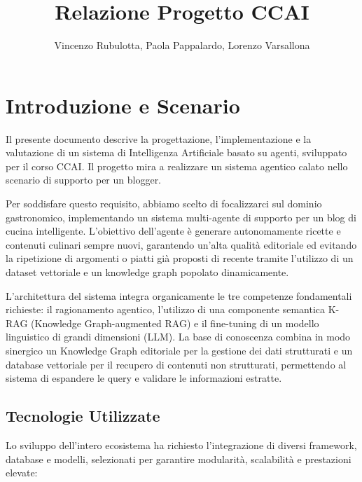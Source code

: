 \documentclass[11pt, a4paper]{article}
\title{Relazione Progetto CCAI}
\author{Vincenzo Rubulotta, Paola Pappalardo, Lorenzo Varsallona}
\date{}
\begin{document}
\maketitle

\section{Introduzione e Scenario}

Il presente documento descrive la progettazione, l'implementazione e la valutazione di un sistema di Intelligenza Artificiale basato su agenti, sviluppato per il corso CCAI. Il progetto mira a realizzare un sistema agentico calato nello scenario di supporto per un blogger. 

Per soddisfare questo requisito, abbiamo scelto di focalizzarci sul dominio gastronomico, implementando un sistema multi-agente di supporto per un blog di cucina intelligente. L'obiettivo dell'agente è generare autonomamente ricette e contenuti culinari sempre nuovi, garantendo un'alta qualità editoriale ed evitando la ripetizione di argomenti o piatti già proposti di recente tramite l'utilizzo di un dataset vettoriale e un knowledge graph popolato dinamicamente.

L'architettura del sistema integra organicamente le tre competenze fondamentali richieste: il ragionamento agentico, l'utilizzo di una componente semantica K-RAG (Knowledge Graph-augmented RAG) e il fine-tuning di un modello linguistico di grandi dimensioni (LLM). La base di conoscenza combina in modo sinergico un Knowledge Graph editoriale per la gestione dei dati strutturati e un database vettoriale per il recupero di contenuti non strutturati, permettendo al sistema di espandere le query e validare le informazioni estratte.

\subsection{Tecnologie Utilizzate}

Lo sviluppo dell'intero ecosistema ha richiesto l'integrazione di diversi framework, database e modelli, selezionati per garantire modularità, scalabilità e prestazioni elevate:
\end{document}
